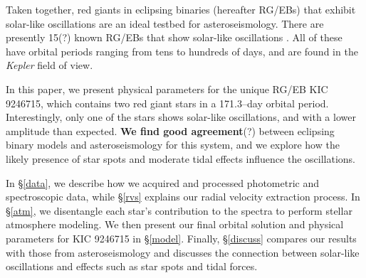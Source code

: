 Taken together, red giants in eclipsing binaries (hereafter RG/EBs) that exhibit solar-like oscillations are an ideal testbed for asteroseismology. There are presently 15(?) known RG/EBs that show solar-like oscillations \citep{gau13,gau14}. All of these have orbital periods ranging from tens to hundreds of days, and are found in the \emph{Kepler} field of view. 

In this paper, we present physical parameters for the unique RG/EB KIC 9246715, which contains two red giant stars in a 171.3--day orbital period. Interestingly, only one of the stars shows solar-like oscillations, and with a lower amplitude than expected. \textbf{We find good agreement}(?) between eclipsing binary models and asteroseismology for this system, and we explore how the likely presence of star spots and moderate tidal effects influence the oscillations.

In \S \ref{data}, we describe how we acquired and processed photometric and spectroscopic data, while \S \ref{rvs} explains our radial velocity extraction process. In \S \ref{atm}, we disentangle each star's contribution to the spectra to perform stellar atmosphere modeling. We then present our final orbital solution and physical parameters for KIC 9246715 in \S \ref{model}. Finally, \S \ref{discuss} compares our results with those from asteroseismology and discusses the connection between solar-like oscillations and effects such as star spots and tidal forces.

